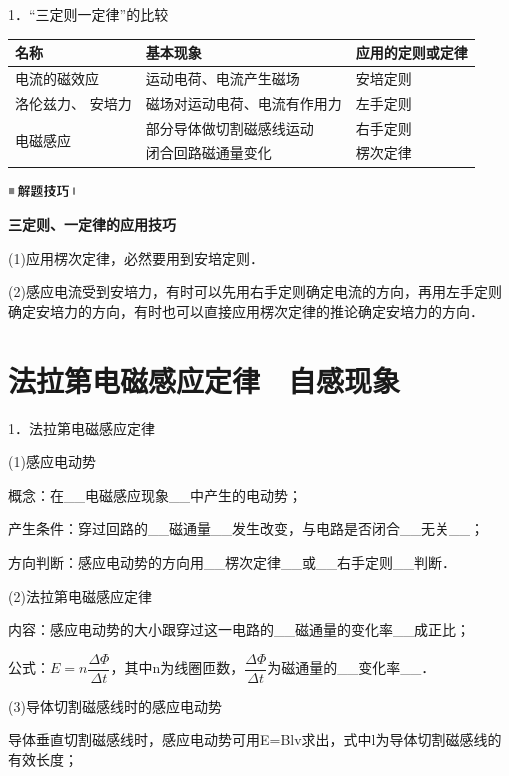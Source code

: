 1．``三定则一定律''的比较

\begin{longtable}[]{@{}m{3cm}m{5cm}m{3cm}@{}}
\toprule
名称 & 基本现象 & 应用的定则或定律\tabularnewline
\midrule
\endhead
电流的磁效应 & 运动电荷、电流产生磁场 & 安培定则\tabularnewline
洛伦兹力、 安培力 & 磁场对运动电荷、电流有作用力 &
左手定则\tabularnewline
\multirow{2}{3cm}{电磁感应} & 部分导体做切割磁感线运动 & 右手定则\tabularnewline
& 闭合回路磁通量变化 & 楞次定律\tabularnewline
\bottomrule
\end{longtable}

\begin{center}\includegraphics[width=0.70764in,height=0.12292in]{media/image37.png}\end{center}
\begin{center}
	\textbf{三定则、一定律的应用技巧}
\end{center}

(1)应用楞次定律，必然要用到安培定则．

(2)感应电流受到安培力，有时可以先用右手定则确定电流的方向，再用左手定则确定安培力的方向，有时也可以直接应用楞次定律的推论确定安培力的方向．


\newpage
\section{法拉第电磁感应定律　自感现象}

1．法拉第电磁感应定律

(1)感应电动势

概念：在\_\_电磁感应现象\_\_中产生的电动势；

产生条件：穿过回路的\_\_磁通量\_\_发生改变，与电路是否闭合\_\_无关\_\_；

方向判断：感应电动势的方向用\_\_楞次定律\_\_或\_\_右手定则\_\_判断．

(2)法拉第电磁感应定律

内容：感应电动势的大小跟穿过这一电路的\_\_磁通量的变化率\_\_成正比；

公式：$E=n \dfrac{\Delta \Phi}{\Delta t}$，其中n为线圈匝数，$\dfrac{\Delta \Phi}{\Delta t}$为磁通量的\_\_变化率\_\_．

(3)导体切割磁感线时的感应电动势

导体垂直切割磁感线时，感应电动势可用E=Blv求出，式中l为导体切割磁感线的有效长度；

